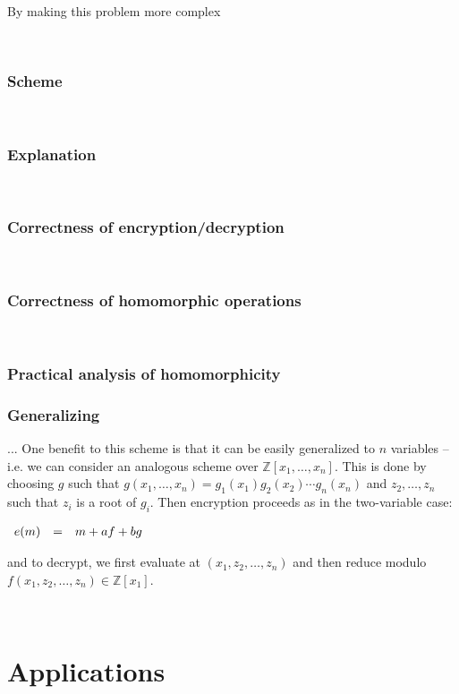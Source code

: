 \documentclass[11pt]{report}
\newcommand{\Z}{\mathbb{Z}}
\newcommand{\ba}{\\ \begin{array}{rcl}}
\newcommand{\ea}{\end{array} \\}
\newcommand{\Zxn}{\mathbb{Z}[x_1,\ldots,x_n]}
\begin{document}
\

By making this problem more complex

\

\subsubsection{Scheme}

\

\subsubsection{Explanation}

\

\subsubsection{Correctness of encryption/decryption}

\

\subsubsection{Correctness of homomorphic operations}

\

\subsubsection{Practical analysis of homomorphicity}

\subsubsection{Generalizing}

... One benefit to this scheme is that it can be easily generalized to $n$ variables -- i.e. we can consider an analogous scheme over $\Zxn$. This is done by choosing $g$ such that $g(x_1,\ldots,x_n) = g_1(x_1)g_2(x_2)\cdots g_n(x_n)$ and $z_2,\ldots,z_n$ such that $z_i$ is a root of $g_i$. Then encryption proceeds as in the two-variable case:

$\ba
e(m) & = & m + af + bg
\ea$

and to decrypt, we first evaluate at $(x_1,z_2,\ldots,z_n)$ and then reduce modulo $f(x_1,z_2,\ldots,z_n) \in \Z[x_1]$.

\


\section{Applications}
\end{document}
